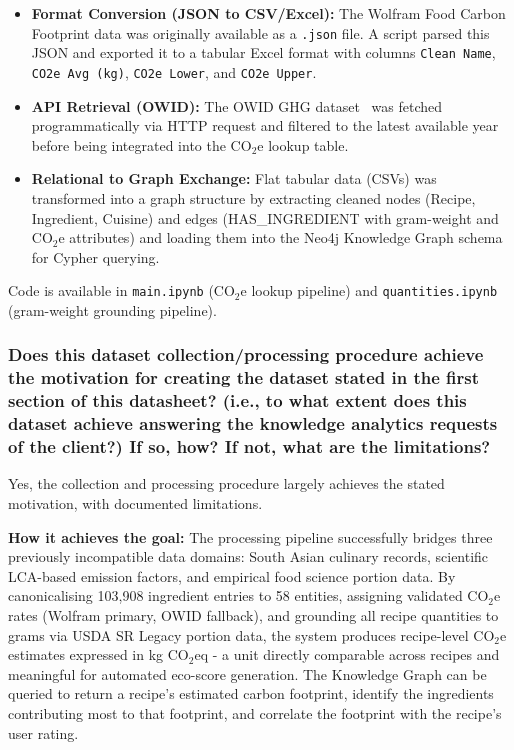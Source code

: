 \documentclass{article}
\newcommand{\question}[1]{#1}
\begin{document}
\begin{itemize}
    \item \textbf{Format Conversion (JSON to CSV/Excel):} The Wolfram Food Carbon Footprint data was originally available as a \texttt{.json} file. A script parsed this JSON and exported it to a tabular Excel format with columns \texttt{Clean Name}, \texttt{CO2e Avg (kg)}, \texttt{CO2e Lower}, and \texttt{CO2e Upper}.
    \item \textbf{API Retrieval (OWID):} The OWID GHG dataset~\cite{owid_ghg} was fetched programmatically via HTTP request and filtered to the latest available year before being integrated into the CO$_2$e lookup table.
    \item \textbf{Relational to Graph Exchange:} Flat tabular data (CSVs) was transformed into a graph structure by extracting cleaned nodes (Recipe, Ingredient, Cuisine) and edges (HAS\_INGREDIENT with gram-weight and CO$_2$e attributes) and loading them into the Neo4j Knowledge Graph schema for Cypher querying.
\end{itemize}

Code is available in \texttt{main.ipynb} (CO$_2$e lookup pipeline) and \texttt{quantities.ipynb} (gram-weight grounding pipeline).

\question{\subsubsection*{Does this dataset collection/processing procedure achieve the motivation for creating the dataset stated in the first section of this datasheet? (i.e., to what extent does this dataset achieve answering the knowledge analytics requests of the client?) If so, how? If not, what are the limitations?}}

Yes, the collection and processing procedure largely achieves the stated motivation, with documented limitations.

\textbf{How it achieves the goal:} The processing pipeline successfully bridges three previously incompatible data domains: South Asian culinary records, scientific LCA-based emission factors, and empirical food science portion data. By canonicalising 103,908 ingredient entries to 58 entities, assigning validated CO$_2$e rates (Wolfram primary, OWID fallback), and grounding all recipe quantities to grams via USDA SR Legacy portion data, the system produces recipe-level CO$_2$e estimates expressed in kg CO$_2$eq - a unit directly comparable across recipes and meaningful for automated eco-score generation. The Knowledge Graph can be queried to return a recipe's estimated carbon footprint, identify the ingredients contributing most to that footprint, and correlate the footprint with the recipe's user rating.
\end{document}
